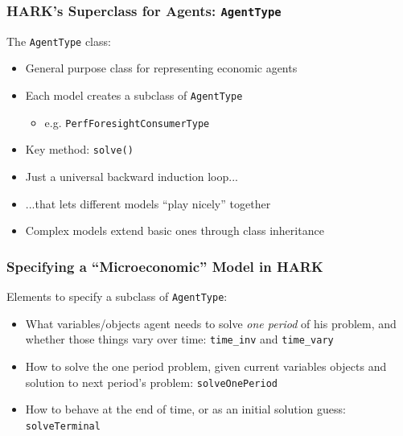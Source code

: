 \documentclass{beamer}
\newcommand{\bi}{\begin{itemize}}
\newcommand{\ei}{\end{itemize}}
\begin{document}
\begin{frame}
\frametitle{HARK's Superclass for Agents: \texttt{AgentType}}

\begin{block}{The \texttt{AgentType} class:}
\bi
\item General purpose class for representing economic agents

\item Each model creates a subclass of \texttt{AgentType}
  \bi
  \item e.g. \texttt{PerfForesightConsumerType}
  \ei
\item Key method: \texttt{solve()}
    
\item Just a universal backward induction loop...

\item ...that lets different models ``play nicely'' together

\item Complex models extend basic ones through class inheritance
\ei

\end{block}
\end{frame}



\begin{frame}
\frametitle{Specifying a ``Microeconomic'' Model in HARK}

\begin{block}{Elements to specify a subclass of \texttt{AgentType}:}
\bi
\item What variables/objects agent needs to solve \textit{one period} of his problem, and whether those things vary over time: \texttt{time\_inv} and \texttt{time\_vary}

\item How to solve the one period problem, given current variables objects and solution to next period's problem: \texttt{solveOnePeriod}

\item How to behave at the end of time, or as an initial solution guess: \texttt{solveTerminal}
\ei
\end{block}
\end{frame}
\end{document}
